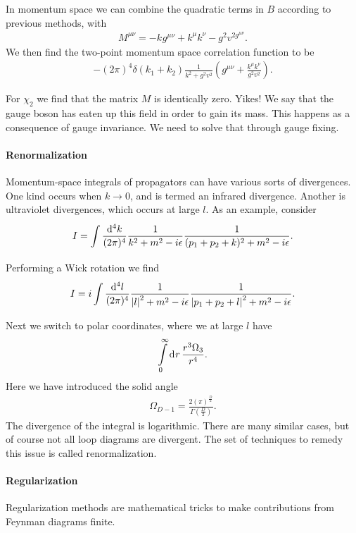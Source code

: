 In momentum space we can combine the quadratic terms in $B$ according to previous methods, with
\begin{align*}
	M^{\mu\nu} = -k^{}g^{\mu\nu} + k^{\mu}k^{\nu} - g^{2}v^{2g^{\mu\nu}}.
\end{align*}
We then find the two-point momentum space correlation function to be
\begin{align*}
	-(2\pi)^{4}\delta(k_{1} + k_{2})\frac{1}{k^{2} + g^{2}v^{2}}\left(g^{\mu\nu} + \frac{k^{\mu}k^{\nu}}{g^{2}v^{2}}\right).
\end{align*}

For $\chi_{2}$ we find that the matrix $M$ is identically zero. Yikes! We say that the gauge boson has eaten up this field in order to gain its mass. This happens as a consequence of gauge invariance. We need to solve that through gauge fixing.

\paragraph{Renormalization}
Momentum-space integrals of propagators can have various sorts of divergences. One kind occurs when $k\to 0$, and is termed an infrared divergence. Another is ultraviolet divergences, which occurs at large $l$. As an example, consider
\begin{align*}
	I = \int\limits_{}^{}\frac{\dd[4]{k}}{(2\pi)^{4}}\frac{1}{k^{2} + m^{2} - i\epsilon}\frac{1}{(p_{1} + p_{2} + k)^{2} + m^{2} - i\epsilon}.
\end{align*}
Performing a Wick rotation  we find
\begin{align*}
	I = i\int\limits_{}^{}\frac{\dd[4]{l}}{(2\pi)^{4}}\frac{1}{\abs{l}^{2} + m^{2} - i\epsilon}\frac{1}{\abs{p_{1} + p_{2} + l}^{2} + m^{2} - i\epsilon}.
\end{align*}
Next we switch to polar coordinates, where we at large $l$ have
\begin{align*}
	\int\limits_{0}^{\infty}\dd[]{r}\frac{r^{3}\Omega_{3}}{r^{4}}.
\end{align*}
Here we have introduced the solid angle
\begin{align*}
	\Omega_{D - 1} = \frac{2(\pi)^{\frac{D}{2}}}{\Gamma\left(\frac{D}{2}\right)}.
\end{align*}
The divergence of the integral is logarithmic. There are many similar cases, but of course not all loop diagrams are divergent. The set of techniques to remedy this issue is called renormalization.

\paragraph{Regularization}
Regularization methods are mathematical tricks to make contributions from Feynman diagrams finite.


